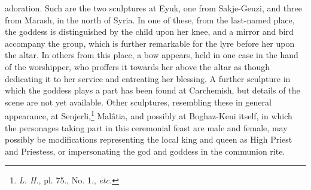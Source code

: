 \documentclass[a4paper, 11pt, oneside, polutonikogreek, english]{article}
\begin{document}
adoration. Such are the two sculptures at Eyuk, one from Sakje-Geuzi, and three from Marash, in the north of Syria. In one of these, from the last-named place, the goddess is distinguished by the child upon her knee, and a mirror and bird accompany the group, which is further remarkable for the lyre before her upon the altar. In others from this place, a bow appears, held in one case in the hand of the worshipper, who proffers it towards her above the altar as though dedicating it to her service and entreating her blessing. A further sculpture in which the goddess plays a part has been found at Carchemish, but details of the scene are not yet available. Other sculptures, resembling these in general appearance, at Senjerli,\footnote{\emph{L. H.}, pl. 75., No. 1., \emph{etc.}} Malâtia, and possibly at Boghaz-Keui itself, in which the personages taking part in this ceremonial feast are male and female, may possibly be modifications representing the local king and queen as High Priest and Priestess, or impersonating the god and goddess in the communion rite.
\end{document}
